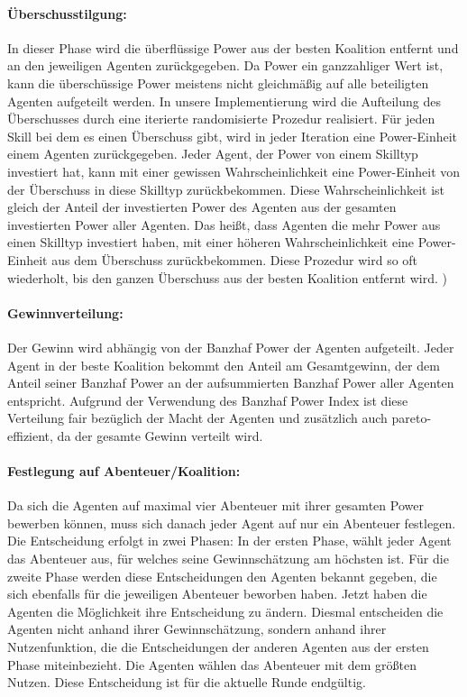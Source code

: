 \documentclass[fleqn,10pt]{SelfArx} %
\begin{document}
\paragraph{Überschusstilgung:} 
In dieser Phase wird die überflüssige Power aus der besten Koalition entfernt und an den jeweiligen Agenten zurückgegeben. Da Power ein ganzzahliger Wert ist, kann die überschüssige Power meistens nicht gleichmäßig auf alle beteiligten Agenten aufgeteilt werden. In unsere Implementierung wird die Aufteilung des Überschusses durch eine iterierte randomisierte Prozedur realisiert. Für jeden Skill bei dem es einen Überschuss gibt, wird in jeder Iteration eine Power-Einheit einem Agenten zurückgegeben. Jeder Agent, der Power von einem Skilltyp investiert hat, kann mit einer gewissen Wahrscheinlichkeit eine Power-Einheit von der Überschuss in diese Skilltyp zurückbekommen. Diese Wahrscheinlichkeit ist gleich der Anteil der investierten Power des Agenten aus der gesamten investierten Power aller Agenten. Das heißt, dass Agenten die mehr Power aus einen Skilltyp investiert haben, mit einer höheren Wahrscheinlichkeit eine Power-Einheit aus dem Überschuss zurückbekommen. Diese Prozedur wird so oft wiederholt, bis den ganzen Überschuss aus der besten Koalition entfernt wird.
)
\paragraph{Gewinnverteilung:}
Der Gewinn wird abhängig von der Banzhaf Power der Agenten aufgeteilt. Jeder Agent in der beste Koalition bekommt den Anteil am Gesamtgewinn, der dem Anteil seiner Banzhaf Power an der aufsummierten Banzhaf Power aller Agenten entspricht. Aufgrund der Verwendung des Banzhaf Power Index ist diese Verteilung fair bezüglich der Macht der Agenten und zusätzlich auch pareto-effizient, da der gesamte Gewinn verteilt wird.

\paragraph{Festlegung auf Abenteuer/Koalition:}
Da sich die Agenten auf maximal vier Abenteuer mit ihrer gesamten Power bewerben können, muss sich danach jeder Agent auf nur ein Abenteuer festlegen. Die Entscheidung erfolgt in zwei Phasen: In der ersten Phase, wählt jeder Agent das Abenteuer aus, für welches seine Gewinnschätzung am höchsten ist. Für die zweite Phase werden diese Entscheidungen den Agenten bekannt gegeben, die sich ebenfalls für die jeweiligen Abenteuer beworben haben. Jetzt haben die Agenten die Möglichkeit ihre Entscheidung zu ändern. Diesmal entscheiden die Agenten nicht anhand ihrer Gewinnschätzung, sondern anhand ihrer Nutzenfunktion, die die Entscheidungen der anderen Agenten aus der ersten Phase miteinbezieht. Die Agenten wählen das Abenteuer mit dem größten Nutzen. Diese Entscheidung ist für die aktuelle Runde endgültig.
\end{document}
